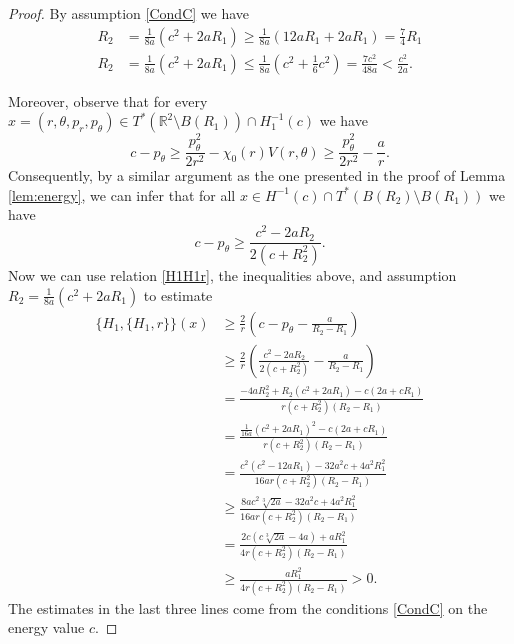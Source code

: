\documentclass[10pt,a4paper]{amsart}
\newcommand{\R}{\mathbb{R}}
\begin{document}
\begin{proof}
By assumption \eqref{CondC} we have
\begin{align}
R_2 & = \frac{1}{8a}\left( c^2+2aR_1\right) \geq \frac{1}{8a}\left( 12aR_1+2aR_1\right)=\frac{7}{4} R_1 \nonumber\\
R_2 & = \frac{1}{8a}\left( c^2+2aR_1\right)\leq\frac{1}{8a}\left( c^2+\frac{1}{6}c^2\right)=\frac{7c^2}{48 a}<\frac{c^2}{2a}.\label{R2small}
\end{align}

Moreover, observe that for every $x=(r,\theta, p_r, p_\theta) \in T^*(\R^2\setminus B(R_1))\cap H_1^{-1}(c)$ we have
$$
c-p_\theta \geq \frac{p_\theta^2}{2 r^2}-\chi_0(r)V(r,\theta)\geq \frac{p_\theta^2}{2 r^2}-\frac{a}{r}.
$$
Consequently, by a similar argument as the one presented in the proof of Lemma \ref{lem:energy}, we can infer that for all $x\in H^{-1}(c)\cap T^*(B(R_2)\setminus B(R_1))$ we have
$$
c-p_\theta \geq \frac{c^2-2aR_2}{2(c+R_2^2)}.
$$
Now we can use relation \eqref{H1H1r}, the inequalities above, and assumption\linebreak $R_2=\frac{1}{8a}\left( c^2+2aR_1\right)$ to estimate
\begin{align*}
\{H_1, \{H_1, r\}\}(x) & \geq  \frac{2}{r}\left( c-p_\theta-\frac{a}{R_2-R_1}\right)\\
& \geq \frac{2}{r}\left(\frac{c^2-2aR_2}{2(c+R_2^2)}-\frac{a}{R_2-R_1}\right)\\
& = \frac{-4a R_2^2+R_2(c^2+2aR_1)-c(2a+cR_1)}{r(c+R_2^2)(R_2-R_1)}\\
& = \frac{\frac{1}{16a}\left( c^2+2aR_1\right)^2-c(2a+cR_1)}{r(c+R_2^2)(R_2-R_1)}\\
& = \frac{c^2\left(c^2-12aR_1\right)-32a^2c+4a^2R_1^2}{16ar(c+R_2^2)(R_2-R_1)}\\
& \geq \frac{8ac^2\sqrt[3]{2a}-32a^2c+4a^2R_1^2}{16ar(c+R_2^2)(R_2-R_1)}\\
& = \frac{2c\left(c\sqrt[3]{2a}-4a\right)+aR_1^2}{4r(c+R_2^2)(R_2-R_1)}\\
& \geq \frac{aR_1^2}{4r(c+R_2^2)(R_2-R_1)}>0.
\end{align*}
The estimates in the last three lines come from the conditions \eqref{CondC} on the energy value $c$.
\end{proof}
\end{document}
